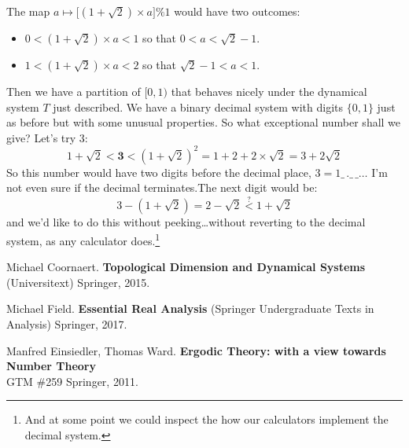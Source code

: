 \documentclass[12pt]{article}
\begin{document}
The map $a \mapsto \big[ (1 + \sqrt{2}) \times a \big] \% 1$ would have two outcomes:
\begin{itemize}
\item $0 < (1 + \sqrt{2}) \times a  < 1 $ so that $0 < a < \sqrt{2}-1$.
\item $1 < (1 + \sqrt{2}) \times a  < 2 $ so that $\sqrt{2}-1 < a < 1 $.
\end{itemize}
Then we have a partition of $[0,1)$ that behaves nicely under the dynamical system $T$ just described.  We have a binary decimal system with digits $\{ 0, 1\}$ just as before but with some unusual properties.  So what exceptional number shall we give?  Let's try $3$:
$$1  + \sqrt{2} < \mathbf{3} < (1 + \sqrt{2})^2 = 1 + 2 + 2 \times \sqrt{2} = 3 + 2 \sqrt{2} $$
So this number would have two digits before the decimal place, $3 = 1\_\,.\_\,\_\dots$
I'm not even sure if the decimal terminates.The next digit would be:
$$ 3 - (1 + \sqrt{2}) = 2 - \sqrt{2} \stackrel{?}{<} 1 + \sqrt{2} $$
and we'd like to do this without peeking\dots without reverting to the decimal system, as any calculator does.\footnote{And at some point we could inspect the how our calculators implement the decimal system.}
\vfill 

\begin{thebibliography}{}

\item Michael Coornaert. \textbf{Topological Dimension and Dynamical Systems} (Universitext) Springer, 2015.

\item Michael Field. \textbf{Essential Real Analysis} (Springer Undergraduate Texts in Analysis) Springer, 2017.


\item Manfred Einsiedler, Thomas Ward. \textbf{Ergodic Theory: with a view towards Number Theory} \\GTM \#259 Springer, 2011.


\end{thebibliography}
\end{document}

